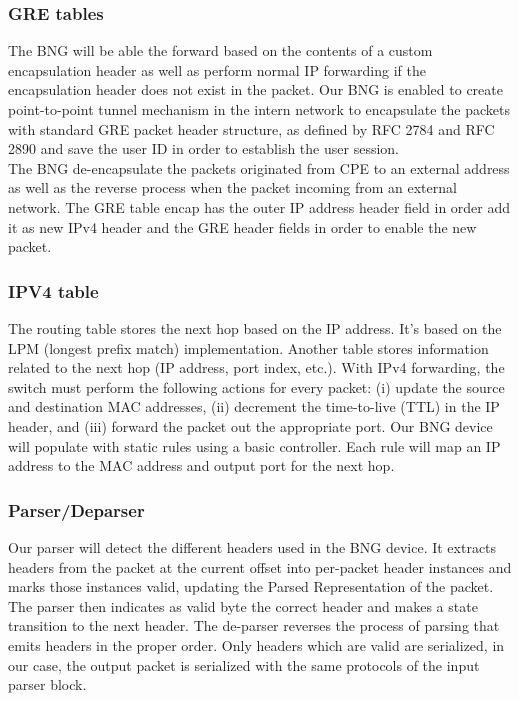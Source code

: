 \subsubsection{GRE tables}
The BNG will be able the forward based on the contents of a custom encapsulation header as well as perform normal IP forwarding if the encapsulation header does not exist in the packet.
Our BNG is enabled to create point-to-point tunnel mechanism in the intern network to encapsulate the packets with standard GRE packet header structure, as defined by RFC 2784 and RFC 2890 and save the user ID in order to establish the user session.\\
The BNG de-encapsulate the packets originated from CPE to an external address as well as the reverse process when the packet incoming from an external network.  The GRE table encap has the outer IP address header field in order add it as new IPv4 header and the GRE header fields in order to enable the new packet.

\subsubsection{IPV4 table}
The routing table stores the next hop based on the IP address. It’s based on the LPM (longest prefix match) implementation. Another table stores information related to the next hop (IP address, port index, etc.).
With IPv4 forwarding, the switch must perform the following actions for every packet: (i) update the source and destination MAC addresses, (ii) decrement the time-to-live (TTL) in the IP header, and (iii) forward the packet out the appropriate port.
Our BNG device will populate with static rules using a basic controller.  Each rule will map an IP address to the MAC address and output port for the next hop.

\subsubsection{Parser/Deparser}
Our parser will detect the different headers used in the BNG device. It extracts headers from the packet at the current offset into per-packet header instances and marks those instances valid, updating the Parsed Representation of the packet. The parser then indicates as valid byte the correct header and makes a state transition to the next header.
The de-parser reverses the process of parsing that emits headers in the proper order. Only headers which are valid are serialized, in our case, the output packet is serialized with the same protocols of the input parser block.

